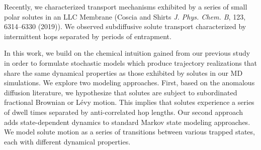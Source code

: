 \documentclass[fontsize=11pt]{article}
\begin{document}
	Recently, we characterized transport mechanisms exhibited by a series of 
	small polar solutes in an LLC Membrane (Coscia and Shirts \textit{J. Phys.
	Chem. B}, 123, 6314--6330 (2019)). We observed subdiffusive solute transport
	characterized by intermittent hops separated by periods of entrapment. 

        In this work, we build on the chemical intuition gained from
        our previous study in order to formulate stochastic models
        which produce trajectory realizations that share the same
        dynamical properties as those exhibited by solutes in our MD
        simulations. We explore two modeling approaches. First, based
        on the anomalous diffusion literature, we hypothesize that
        solutes are subject to subordinated fractional Brownian or
        L\'evy motion. This implies that solutes experience a series
        of dwell times separated by anti-correlated hop lengths. Our
        second approach adds state-dependent dynamics to standard
        Markov state modeling approaches. We model solute motion as a
        series of transitions between various trapped states, each
        with different dynamical properties.
	
	
\end{document}
